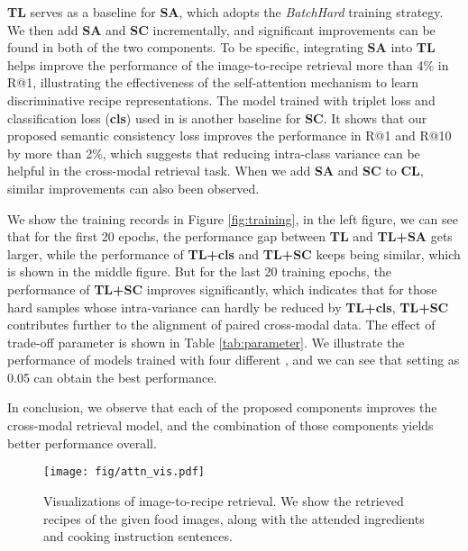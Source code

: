 \documentclass[journal]{IEEEtran}
\begin{document}
\textbf{TL} serves as a baseline for \textbf{SA}, which adopts the \emph{BatchHard} \cite{hermans2017defense} training strategy. We then add \textbf{SA} and \textbf{SC} incrementally, and significant improvements can be found in both of the two components. To be specific, integrating \textbf{SA} into \textbf{TL} helps improve the performance of the image-to-recipe retrieval more than 4\% in R@1, illustrating the effectiveness of the self-attention mechanism to learn discriminative recipe representations. The model trained with triplet loss and classification loss (\textbf{cls}) used in \cite{salvador2017learning} is another baseline for \textbf{SC}. It shows that our proposed semantic consistency loss improves the performance in R@1 and R@10 by more than 2\%, which suggests that reducing intra-class variance can be helpful in the cross-modal retrieval task. When we add \textbf{SA} and \textbf{SC} to \textbf{CL}, similar improvements can also been observed.

We show the training records in Figure \ref{fig:training}, in the left figure, we can see that for the first 20 epochs, the performance gap between \textbf{TL} and \textbf{TL+SA} gets larger, while the performance of \textbf{TL+cls} and \textbf{TL+SC} keeps being similar, which is shown in the middle figure. But for the last 20 training epochs, the performance of \textbf{TL+SC} improves significantly, which indicates that for those hard samples whose intra-variance can hardly be reduced by \textbf{TL+cls}, \textbf{TL+SC} contributes further to the alignment of paired cross-modal data. The effect of trade-off parameter  is shown in Table \ref{tab:parameter}. We illustrate the performance of models trained with four different , and we can see that setting  as 0.05 can obtain the best performance.

In conclusion, we observe that each of the proposed components improves the cross-modal retrieval model, and the combination of those components yields better performance overall. 

\begin{figure*}[h!]
\begin{center}
\texttt{[image: fig/attn\_vis.pdf]}
\end{center}
   \caption{Visualizations of image-to-recipe retrieval. We show the retrieved recipes of the given food images, along with the attended ingredients and cooking instruction sentences.}
\label{fig:attn_vis}
\end{figure*}
\end{document}
